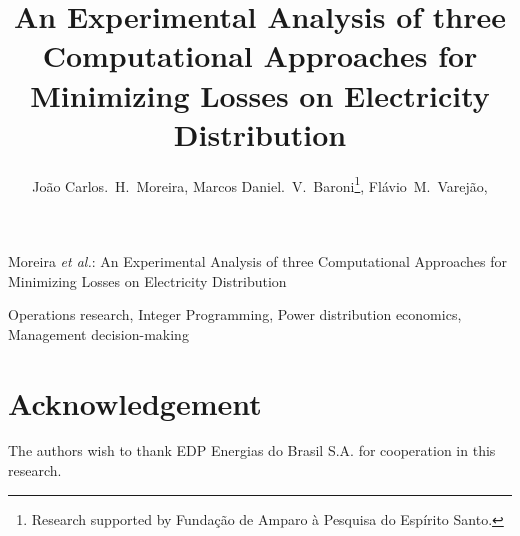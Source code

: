 \documentclass{IEEEtran}
\begin{document}
\title{An Experimental Analysis of three Computational Approaches for Minimizing Losses on Electricity Distribution}

\author{Jo\~ao Carlos.~H.~Moreira,
	Marcos Daniel.~V.~Baroni\thanks{Research supported by Funda\c c\~ao de Amparo \`a Pesquisa do Esp\'irito Santo.},
	Fl\'avio~M.~Varej\~ao,
}

%
{Moreira \MakeLowercase{\textit{et al.}}: An Experimental Analysis of three Computational Approaches for Minimizing Losses on Electricity Distribution}

\maketitle

\begin{abstract}

\end{abstract}

\begin{IEEEkeywords}
Operations research, Integer Programming, Power distribution economics, Management decision-making
\end{IEEEkeywords}

\IEEEpeerreviewmaketitle









\section*{Acknowledgement}
The authors wish to thank EDP Energias do Brasil S.A. for cooperation in this research.

\ifCLASSOPTIONcaptionsoff
  \newpage
\fi





\flushend
\end{document}
